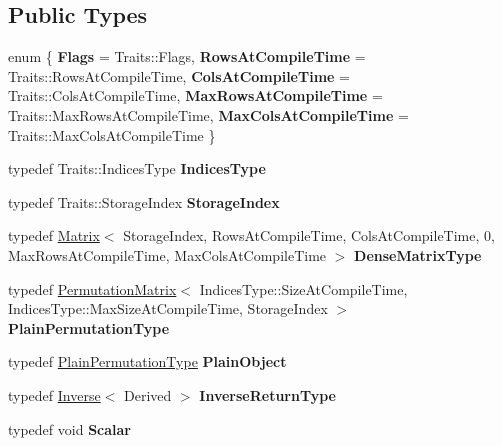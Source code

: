 \subsection*{Public Types}
\begin{DoxyCompactItemize}
\item 
\mbox{\label{class_eigen_1_1_permutation_base_a1387cf6b77cb3582d2409e2609216a96}} 
enum \{ \newline
{\bfseries Flags} = Traits\+::Flags, 
{\bfseries Rows\+At\+Compile\+Time} = Traits\+::Rows\+At\+Compile\+Time, 
{\bfseries Cols\+At\+Compile\+Time} = Traits\+::Cols\+At\+Compile\+Time, 
{\bfseries Max\+Rows\+At\+Compile\+Time} = Traits\+::Max\+Rows\+At\+Compile\+Time, 
\newline
{\bfseries Max\+Cols\+At\+Compile\+Time} = Traits\+::Max\+Cols\+At\+Compile\+Time
 \}
\item 
\mbox{\label{class_eigen_1_1_permutation_base_a11a8d815a7163acaec4d8497bc30f15c}} 
typedef Traits\+::\+Indices\+Type {\bfseries Indices\+Type}
\item 
\mbox{\label{class_eigen_1_1_permutation_base_a1408a1f1e82e9e0eb53f831de4303385}} 
typedef Traits\+::\+Storage\+Index {\bfseries Storage\+Index}
\item 
\mbox{\label{class_eigen_1_1_permutation_base_a76a06b3bcf28bc0a7c24f6f50b0cc5ce}} 
typedef \mbox{\hyperlink{class_eigen_1_1_matrix}{Matrix}}$<$ Storage\+Index, Rows\+At\+Compile\+Time, Cols\+At\+Compile\+Time, 0, Max\+Rows\+At\+Compile\+Time, Max\+Cols\+At\+Compile\+Time $>$ {\bfseries Dense\+Matrix\+Type}
\item 
\mbox{\label{class_eigen_1_1_permutation_base_a5e9551d2cea8ea2d7cf1d136f0f35f84}} 
typedef \mbox{\hyperlink{class_eigen_1_1_permutation_matrix}{Permutation\+Matrix}}$<$ Indices\+Type\+::\+Size\+At\+Compile\+Time, Indices\+Type\+::\+Max\+Size\+At\+Compile\+Time, Storage\+Index $>$ {\bfseries Plain\+Permutation\+Type}
\item 
\mbox{\label{class_eigen_1_1_permutation_base_a1992da5629370505e90cb22143863e27}} 
typedef \mbox{\hyperlink{class_eigen_1_1_permutation_matrix}{Plain\+Permutation\+Type}} {\bfseries Plain\+Object}
\item 
\mbox{\label{class_eigen_1_1_permutation_base_a24cff6349c471fcf3c6ed92d5c150e64}} 
typedef \mbox{\hyperlink{class_eigen_1_1_inverse}{Inverse}}$<$ Derived $>$ {\bfseries Inverse\+Return\+Type}
\item 
\mbox{\label{class_eigen_1_1_permutation_base_a82c2e180bd76235ce6ed5968d56266dc}} 
typedef void {\bfseries Scalar}
\end{DoxyCompactItemize}
